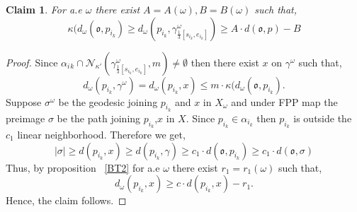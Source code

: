 \documentclass[10pt,a4paper]{amsart}
\newtheorem{claim}{Claim}
\begin{document}
   \begin{claim} \label{313}
     For a.e $\omega$ there exist $A=A(\omega), B=B(\omega)$ such that, \[\kappa(d_\omega(\mathfrak{o},p_{i_k})\geq d_\omega(p_{i_k},\gamma^\omega_{\frac 13[s_{i_k},e_{i_k}]}) \geq A \cdot d(\mathfrak{o},p)-B\]  
   \end{claim}

    \begin{proof}
    Since  $\alpha_i{_k} \cap \mathcal{N}_{\kappa'} (\gamma^\omega_{\frac 13[s_{i_k},e_{i_k}]}, m) \neq \emptyset$ then there exist $x$ on $\gamma^\omega$ such that, \[ d_\omega(p_{i_k}, \gamma^\omega)=d_\omega(p_{i_k}, x) \leq m \cdot \kappa(d_\omega(\mathfrak{o},p_{i_k}).\] Suppose $\sigma^\omega$ be the geodesic joining $p_{i_k}$ and $x$ in $X_\omega$ and under FPP map the preimage $\sigma$ be the path joining $p_{i_k}$,$x$ in $X$. Since $p_{i_k} \in \alpha_{i_k}$ then $p_{i_k}$ is outside the $c_1$ linear neighborhood. Therefore we get, 
    \[|\sigma|\geq d(p_{i_k},x)\geq d(p_{i_k},\gamma)\geq c_1 \cdot d(\mathfrak{o},p_{i_k}) \geq c_1 \cdot d(\mathfrak{o}, \sigma)\]
    Thus, by proposition ~\ref{BT2} for a.e $\omega$ there exist $r_1=r_1(\omega)$ such that, \[ d_\omega(p_{i_k},x)\geq c \cdot d(p_{i_k},x)-r_1.\] Hence, the claim follows.
    \end{proof}
\end{document}
